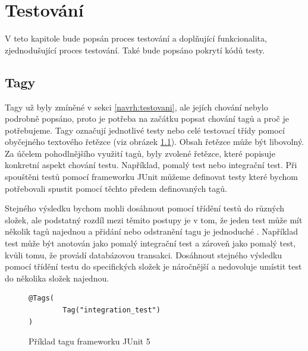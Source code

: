 \chapter{Testování}\label{chapter:testovani}
V teto kapitole bude popsán proces testování a doplňující funkcionalita, zjednodušující proces testování. Také bude popsáno pokrytí kódů testy.

\section{Tagy}\label{testovani:tagy}
    Tagy už byly zmíněné v sekci \ref{navrh:testovani}, ale jejích chování nebylo podrobně popsáno, proto je potřeba na začátku popsat chování tagů a proč je potřebujeme. Tagy označují jednotlivé testy nebo celé testovací třídy pomocí obyčejného textového řetězce (viz obrázek \ref{code:tag-junit-5}). Obsah řetězce může být libovolný. Za účelem pohodlnějšího využití tagů, byly zvolené řetězce, které popisuje konkretní aspekt chování testu. Například, pomalý test nebo integrační test. Při spouštěni testů pomocí frameworku JUnit můžeme definovat testy které bychom potřebovali spustit pomocí těchto předem definovaných tagů.
    
    Stejného výsledku bychom mohli dosáhnout pomocí třídění testů do různých složek, ale podstatný rozdíl mezi těmito postupy je v tom, že jeden test může mít několik tagů najednou a přidání nebo odstranění tagu je jednoduché . Například test může být anotován jako pomalý integrační test a zároveň jako pomalý test, kvůli tomu, že provádí databázovou transakci. Dosáhnout stejného výsledku pomocí třídění testu do specifických složek je náročnější a nedovoluje umístit test do několika složek najednou.
    \begin{figure}
        \begin{verbatim}
@Tags(
        Tag("integration_test")
)
        \end{verbatim}
        \caption{Příklad tagu frameworku JUnit 5} 
        \label{code:tag-junit-5}
    \end{figure}
    
